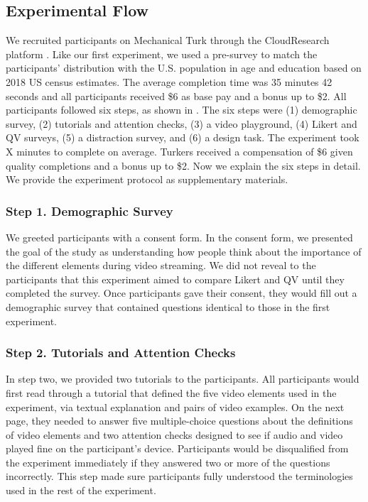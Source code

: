 \subsection{Experimental Flow}
We recruited participants on Mechanical Turk through the CloudResearch platform \cite{litman2017turkprime}. Like our first experiment, we used a pre-survey to match the participants' distribution with the U.S. population in age and education based on 2018 US census estimates. The average completion time was 35 minutes 42 seconds and all participants received \$6 as base pay and a bonus up to \$2. All participants followed six steps, as shown in . The six steps were (1) demographic survey, (2) tutorials and attention checks, (3) a video playground, (4) Likert and QV surveys, (5) a distraction survey, and (6) a design task. The experiment took X minutes to complete on average. Turkers received a compensation of \$6 given quality completions and a bonus up to \$2. Now we explain the six steps in detail. We provide the experiment protocol as supplementary materials.

\subsubsection{Step 1. Demographic Survey}
We greeted participants with a consent form. In the consent form, we presented the goal of the study as understanding how people think about the importance of the different elements during video streaming. We did not reveal to the participants that this experiment aimed to compare Likert and QV until they completed the survey. Once participants gave their consent, they would fill out a demographic survey that contained questions identical to those in the first experiment.

\subsubsection{Step 2. Tutorials and Attention Checks}
In step two, we provided two tutorials to the participants. All participants would first read through a tutorial that defined the five video elements used in the experiment, via textual explanation and pairs of video examples. On the next page, they needed to answer five multiple-choice questions about the definitions of video elements and two attention checks designed to see if audio and video played fine on the participant's device. Participants would be disqualified from the experiment immediately if they answered two or more of the questions incorrectly. This step made sure participants fully understood the terminologies used in the rest of the experiment.

